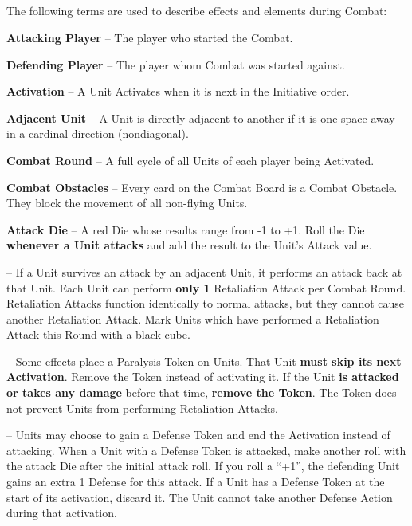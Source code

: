 \begin{multicols}{2}
\subsection*{}
The following terms are used to describe effects and elements during Combat:\par
\textbf{Attacking Player} – The player who started the Combat.\par
\textbf{Defending Player} – The player whom Combat was started against.\par
\textbf{Activation} – A Unit Activates when it is next in the Initiative order.\par
\textbf{Adjacent Unit} – A Unit is directly adjacent to another if it is one space away in a cardinal direction (nondiagonal).\par
\textbf{Combat Round} – A full cycle of all Units of each player being Activated.\par
\textbf{Combat Obstacles} – Every card on the Combat Board is a Combat Obstacle.
They block the movement of all non-flying Units.\smallskip\par
{}\parbox{0.7\hsize}{\textbf{Attack Die} – A red Die whose results range from -1 to +1.
Roll the Die \textbf{whenever a Unit attacks} and
add the result to the Unit's Attack value.}\par\smallskip
\textbf{} – If a Unit survives an attack by an adjacent Unit, it performs an attack back at that Unit.
Each Unit can perform \textbf{only 1} Retaliation Attack per Combat Round.
Retaliation Attacks function identically to normal attacks, but they cannot cause another Retaliation Attack.
Mark Units which have performed a Retaliation Attack this Round with a black cube.\par
\textbf{}  – Some effects place a Paralysis Token on Units.
That Unit \textbf{must skip its next Activation}. Remove the Token instead of activating it.
If the Unit \textbf{is attacked or takes any damage} before that time, \textbf{remove the Token}.
The Token does not prevent Units from performing Retaliation Attacks.\par
\textbf{}  – Units may choose to gain a Defense Token and end the Activation instead of attacking.
When a Unit with a Defense Token is attacked, make another roll with the attack Die after the initial attack roll.
If you roll a ``+1'', the defending Unit gains an extra 1 Defense for this attack.
If a Unit has a Defense Token at the start of its activation, discard it.
The Unit cannot take another Defense Action during that activation.


\end{multicols}
